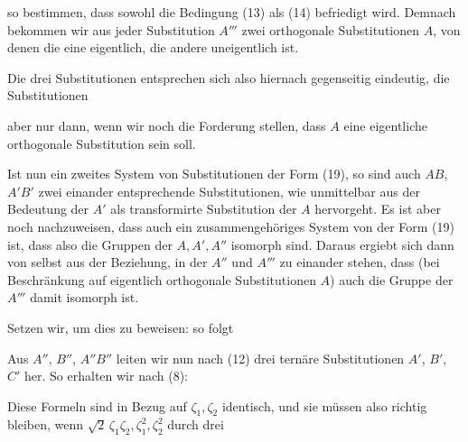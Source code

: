 so bestimmen, dass sowohl die Bedingung (13) als (14) befriedigt
wird. %
Demnach bekommen wir aus jeder Substitution $A'''$ zwei
orthogonale Substitutionen $A$, von denen die eine eigentlich, die
andere uneigentlich ist.

Die drei Substitutionen
entsprechen sich also hiernach gegenseitig eindeutig, die Substitutionen

aber nur dann, wenn wir noch die Forderung stellen, dass $A$
eine eigentliche orthogonale Substitution sein soll.

Ist nun
ein zweites System von Substitutionen der Form (19), so sind
auch $AB$, $A'B'$ zwei einander entsprechende Substitutionen, wie
unmittelbar aus der Bedeutung der $A'$ als transformirte Substitution
 der $A$ hervorgeht. Es ist aber noch nachzuweisen,
dass auch
ein zusammengehöriges System von der Form (19) ist, dass also
die Gruppen der $A, A', A''$ isomorph sind. Daraus ergiebt sich
dann von selbst aus der Beziehung, in der $A''$ und $A'''$ zu einander
 stehen, dass (bei Beschränkung auf eigentlich orthogonale
Substitutionen $A$) auch die Gruppe der $A'''$ damit isomorph ist.

Setzen wir, um dies zu beweisen:
so folgt

Aus $A''$, $B''$, $A''B''$ leiten wir nun nach (12) drei ternäre
Substitutionen $A'$, $B'$, $C'$ her. So erhalten wir nach (8):

Diese Formeln sind in Bezug auf $\zeta_1, \zeta_2$ identisch, und sie
müssen also richtig bleiben, wenn $\sqrt{2}\,\zeta_1\zeta_2, \zeta_1^2, \zeta_2^2$ durch drei
